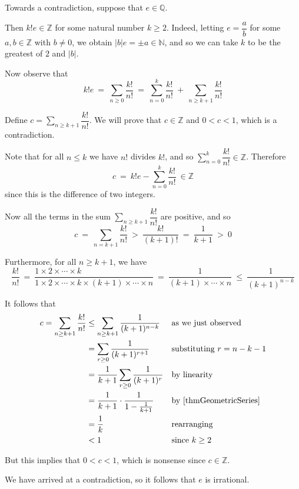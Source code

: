 \begin{cproof}
Towards a contradiction, suppose that $e \in \mathbb{Q}$.

Then $k!e \in \mathbb{Z}$ for some natural number $k \ge 2$. Indeed, letting $e = \dfrac{a}{b}$ for some $a,b \in \mathbb{Z}$ with $b \ne 0$, we obtain $|b|e = \pm a \in \mathbb{N}$, and so we can take $k$ to be the greatest of $2$ and $|b|$.

Now observe that
\[ k!e ~=~ \sum_{n \ge 0} \dfrac{k!}{n!} ~=~ \sum_{n=0}^k \dfrac{k!}{n!} ~+~ \sum_{n \ge k+1} \dfrac{k!}{n!} \]

Define $c = \displaystyle \sum_{n \ge k+1} \dfrac{k!}{n!}$. We will prove that $c \in \mathbb{Z}$ and $0<c<1$, which is a contradiction.

Note that for all $n \le k$ we have $n!$ divides $k!$, and so $\displaystyle \sum_{n=0}^k \dfrac{k!}{n!} \in \mathbb{Z}$. Therefore
\[ c ~=~ k!e - \sum_{n=0}^k \dfrac{k!}{n!} ~\in \mathbb{Z} \]
since this is the difference of two integers.

Now all the terms in the sum $\displaystyle \sum_{n \ge k+1} \dfrac{k!}{n!}$ are positive, and so 
\[ c ~=~ \sum_{n=k+1} \dfrac{k!}{n!} ~>~ \dfrac{k!}{(k+1)!} ~=~ \dfrac{1}{k+1} ~>~ 0 \]

Furthermore, for all $n \ge k+1$, we have
\[ \dfrac{k!}{n!} ~=~ \dfrac{1 \times 2 \times \cdots \times k \phantom{{} \times (k+1) \times \cdots \times n}}{1 \times 2 \times \cdots \times k \times (k+1) \times \cdots \times n} ~=~ \dfrac{1}{(k+1) \times \cdots \times n} ~\le~ \dfrac{1}{(k+1)^{n-k}} \]

It follows that
\begin{align*}
c = \sum_{n \ge k+1} \dfrac{k!}{n!} &\le \sum_{n \ge k+1} \dfrac{1}{(k+1)^{n-k}} && \text{as we just observed} \\
&= \sum_{r \ge 0} \dfrac{1}{(k+1)^{r+1}} && \text{substituting $r=n-k-1$} \\
&= \dfrac{1}{k+1} \sum_{r \ge 0} \dfrac{1}{(k+1)^r} && \text{by linearity} \\
&= \dfrac{1}{k+1} \cdot \dfrac{1}{1-\frac{1}{k+1}} && \text{by \Cref{thmGeometricSeries}} \\
&= \dfrac{1}{k} && \text{rearranging} \\
&< 1 && \text{since $k \ge 2$}
\end{align*}

But this implies that $0 < c < 1$, which is nonsense since $c \in \mathbb{Z}$.

We have arrived at a contradiction, so it follows that $e$ is irrational.
\end{cproof}